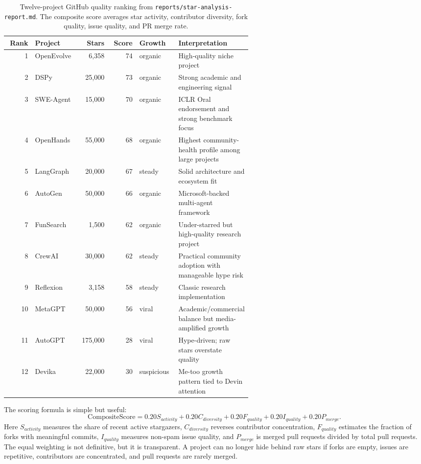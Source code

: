 \begin{table}[t]
\centering
\small
\caption{Twelve-project GitHub quality ranking from \texttt{reports/star-analysis-report.md}. The composite score averages star activity, contributor diversity, fork quality, issue quality, and PR merge rate.}
\label{tab:star-ranking}
\begin{tabular}{r p{0.18\linewidth} r r p{0.16\linewidth} p{0.24\linewidth}}
\toprule
\textbf{Rank} & \textbf{Project} & \textbf{Stars} & \textbf{Score} & \textbf{Growth} & \textbf{Interpretation} \\
\midrule
1 & OpenEvolve & 6,358 & 74 & organic & High-quality niche project \\
2 & DSPy & 25,000 & 73 & organic & Strong academic and engineering signal \\
3 & SWE-Agent & 15,000 & 70 & organic & ICLR Oral endorsement and strong benchmark focus \\
4 & OpenHands & 55,000 & 68 & organic & Highest community-health profile among large projects \\
5 & LangGraph & 20,000 & 67 & steady & Solid architecture and ecosystem fit \\
6 & AutoGen & 50,000 & 66 & organic & Microsoft-backed multi-agent framework \\
7 & FunSearch & 1,500 & 62 & organic & Under-starred but high-quality research project \\
8 & CrewAI & 30,000 & 62 & steady & Practical community adoption with manageable hype risk \\
9 & Reflexion & 3,158 & 58 & steady & Classic research implementation \\
10 & MetaGPT & 50,000 & 56 & viral & Academic/commercial balance but media-amplified growth \\
11 & AutoGPT & 175,000 & 28 & viral & Hype-driven; raw stars overstate quality \\
12 & Devika & 22,000 & 30 & suspicious & Me-too growth pattern tied to Devin attention \\
\bottomrule
\end{tabular}
\end{table}

The scoring formula is simple but useful:
\begin{equation}
\mathrm{CompositeScore}=0.20 S_{activity}+0.20 C_{diversity}+0.20 F_{quality}+0.20 I_{quality}+0.20 P_{merge}.
\end{equation}
Here $S_{activity}$ measures the share of recent active stargazers, $C_{diversity}$ reverses contributor concentration, $F_{quality}$ estimates the fraction of forks with meaningful commits, $I_{quality}$ measures non-spam issue quality, and $P_{merge}$ is merged pull requests divided by total pull requests. The equal weighting is not definitive, but it is transparent. A project can no longer hide behind raw stars if forks are empty, issues are repetitive, contributors are concentrated, and pull requests are rarely merged.


